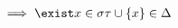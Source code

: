 \documentclass[preview]{standalone}
\begin{document}
\begin{align*}
\implies \exist x\in\sigma \tau\cup\{x\}\in\Delta
\end{align*}
\end{document}
